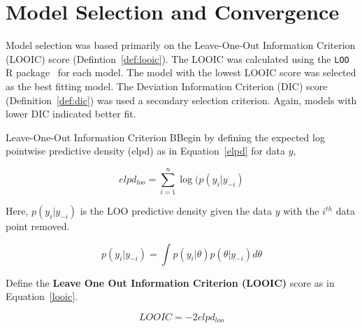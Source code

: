 \section{Model Selection and Convergence}
Model selection was based primarily on the Leave-One-Out Information Criterion (LOOIC) score (Defintion~\ref{def:looic}). The LOOIC was calculated using the \verb|LOO| R package~\cite{loo} for each model. The model with the lowest LOOIC score was selected as the best fitting model. The Deviation Information Criterion (DIC) score (Definition~\ref{def:dic}) was used a secondary selection criterion. Again, models with lower DIC indicated better fit.

\begin{definition}{Leave-One-Out Information Criterion}
    BBegin by defining the expected log pointwise predictive density (elpd) as in Equation~\ref{elpd} for data $y$,
    
    \begin{equation}
        elpd_{loo} = \sum_{i = 1}^n \log(p(y_i | y_{-i})
        \label{elpd}
    \end{equation}
    
    Here, $p(y_i|y_{-i})$ is the LOO predictive density given the data $y$ with the $i^{th}$ data point removed.
    
    \begin{equation}
        p(y_i | y_{-i}) = \int p(y_i|\theta)p(\theta|y_{-i})d\theta
        \label{loopd}
    \end{equation}
    
    Define the \textbf{Leave One Out Information Criterion (LOOIC)} score as in Equation~\ref{looic}.
    
    \begin{equation}
        LOOIC = -2elpd_{loo}
        \label{looic}
    \end{equation}
    \label{def:looic}
\end{definition}

